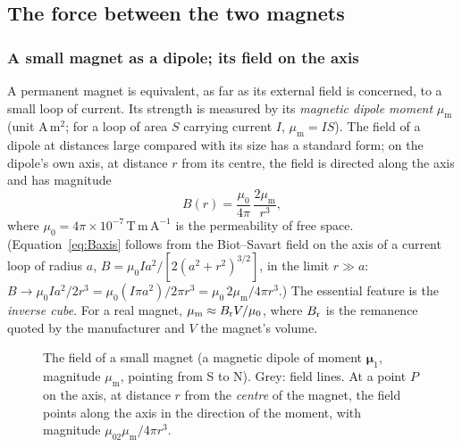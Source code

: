 \documentclass[11pt,a4paper]{article}
\newcommand{\magnetSN}[4]{%
  \fill[magnetS] (#1,#2) rectangle ({#1+#3/2},{#2+#4});
  \fill[magnetN] ({#1+#3/2},#2) rectangle ({#1+#3},{#2+#4});
  \node[white,font=\tiny] at ({#1+#3/4},{#2+#4/2}) {S};
  \node[white,font=\tiny] at ({#1+3*#3/4},{#2+#4/2}) {N};}
\newcommand{\muz}{\mu_0}
\newcommand{\mum}{\mu_{\mathrm m}}
\newcommand{\un}[1]{\,\mathrm{#1}}
\begin{document}
\subsection{The force between the two magnets}\label{sec:force}

\subsubsection{A small magnet as a dipole; its field on the axis}

A permanent magnet is equivalent, as far as its external field is concerned, to a small loop of current. Its strength is measured by its \emph{magnetic dipole moment} $\mum$ (unit $\mathrm{A\,m^2}$; for a loop of area $S$ carrying current $I$, $\mum=IS$). The field of a dipole at distances large compared with its size has a standard form; on the dipole's own axis, at distance $r$ from its centre, the field is directed along the axis and has magnitude
\begin{equation}
B(r)=\frac{\muz}{4\pi}\,\frac{2\mum}{r^3},
\label{eq:Baxis}
\end{equation}
where $\muz=4\pi\times10^{-7}\un{T\,m\,A^{-1}}$ is the permeability of free space. (Equation~\eqref{eq:Baxis} follows from the Biot--Savart field on the axis of a current loop of radius $a$, $B=\muz Ia^2/[2(a^2+r^2)^{3/2}]$, in the limit $r\gg a$: $B\to\muz Ia^2/2r^3=\muz(I\pi a^2)/2\pi r^3=\muz\,2\mum/4\pi r^3$.) The essential feature is the \emph{inverse cube}. For a real magnet, $\mum\approx B_{\rm r}V/\muz$, where $B_{\rm r}$ is the remanence quoted by the manufacturer and $V$ the magnet's volume.

\begin{figure}[htbp]
\centering
{}
\caption{The field of a small magnet (a magnetic dipole of moment $\bm\mu_1$, magnitude $\mum$, pointing from S to N). Grey: field lines. At a point $P$ on the axis, at distance $r$ from the \emph{centre} of the magnet, the field points along the axis in the direction of the moment, with magnitude $\muz2\mum/4\pi r^3$.}
\label{fig:dipole}
\end{figure}
\end{document}

